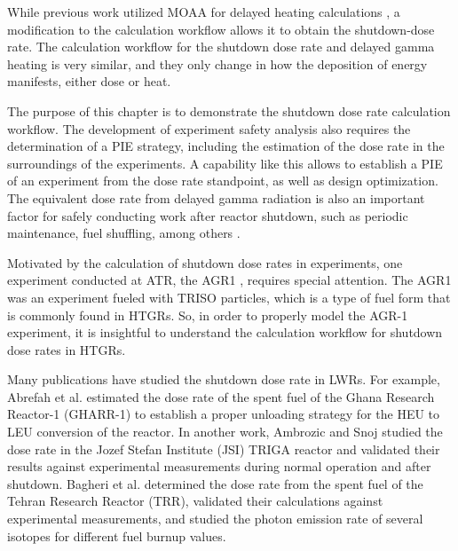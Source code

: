 \label{ch:sdr}

While previous work utilized MOAA for delayed heating calculations \cite{fairhurst_decay_2022, fairhurst_demonstration_2022, fairhurst_database_2022}, a modification to the calculation workflow allows it to obtain the shutdown-dose rate.
The calculation workflow for the shutdown dose rate and delayed gamma heating is very similar, and they only change in how the deposition of energy manifests, either dose or heat.

The purpose of this chapter is to demonstrate the shutdown dose rate calculation workflow.
The development of experiment safety analysis also requires the determination of a \gls*{PIE} strategy, including the estimation of the dose rate in the surroundings of the experiments.
A capability like this allows to establish a \gls*{PIE} of an experiment from the dose rate standpoint, as well as design optimization.
% 
The equivalent dose rate from delayed gamma radiation is also an important factor for safely conducting work after reactor shutdown, such as periodic maintenance, fuel shuffling, among others \cite{ho_calculation_2022}.

Motivated by the calculation of shutdown dose rates in experiments, one experiment conducted at \gls*{ATR}, the \gls*{AGR1} \cite{sterbentz_agr1_2018}, requires special attention.
The \gls*{AGR1} was an experiment fueled with \gls*{TRISO} particles, which is a type of fuel form that is commonly found in \glspl*{HTGR}.
So, in order to properly model the AGR-1 experiment, it is insightful to understand the calculation workflow for shutdown dose rates in \glspl*{HTGR}.

Many publications have studied the shutdown dose rate in \glspl*{LWR}.
%
For example, Abrefah et al. \cite{abrefah_estimation_2018} estimated the dose rate of the spent fuel of the Ghana Research Reactor-1 (GHARR-1) to establish a proper unloading strategy for the \gls*{HEU} to \gls*{LEU} conversion of the reactor.
%
In another work, Ambrozic and Snoj \cite{ambrozic_JSIR2S_2020} studied the dose rate in the Jozef Stefan Institute (JSI) TRIGA reactor and validated their results against experimental measurements during normal operation and after shutdown.
%
Bagheri et al. \cite{bagheri_gamma_2021} determined the dose rate from the spent fuel of the Tehran Research Reactor (TRR), validated their calculations against experimental measurements, and studied the photon emission rate of several isotopes for different fuel burnup values.


